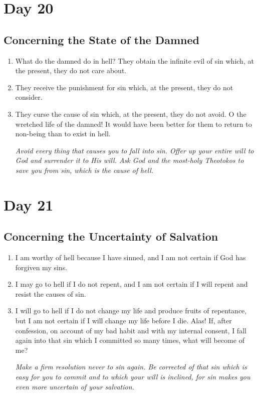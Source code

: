 \documentclass[11pt]{article}
\begin{document}
\section*{Day 20}
\label{sec:org9236e2d}
\subsection*{Concerning the State of the Damned}
\label{sec:org43c4cd5}
\begin{enumerate}
\item What do the damned do in hell? They obtain the infinite evil of sin which, at the present, they do not care about.
\item They receive the punishment for sin which, at the present, they do not consider.
\item They curse the cause of sin which, at the present, they do not avoid. O the wretched life of the damned! It would have been better for
them to return to non-being than to exist in hell.

\emph{Avoid every thing that causes you to fall into sin. Offer up your entire will to God and surrender it to His will. Ask God and the most-holy Theotokos to}
\emph{save you from sin, which is the cause of hell.}
\end{enumerate}
\section*{Day 21}
\label{sec:orgea2a098}
\subsection*{Concerning the Uncertainty of Salvation}
\label{sec:orgdca32be}
\begin{enumerate}
\item I am worthy of hell because I have sinned, and I am not certain if God has forgiven my sins.
\item I may go to hell if I do not repent, and I am not certain if I will repent and resist the causes of sin.
\item I will go to hell if I do not change my life and produce fruits of repentance, but I am not certain if I will change my life before I die. Alas!
If, after confession, on account of my bad habit and with my internal consent, I fall again into that sin which I committed so many times, what
will become of me?

\emph{Make a firm resolution never to sin again. Be corrected of that sin which is easy for you to commit and to which your will is inclined, for sin makes}
\emph{you even more uncertain of your salvation.}
\end{enumerate}
\end{document}
